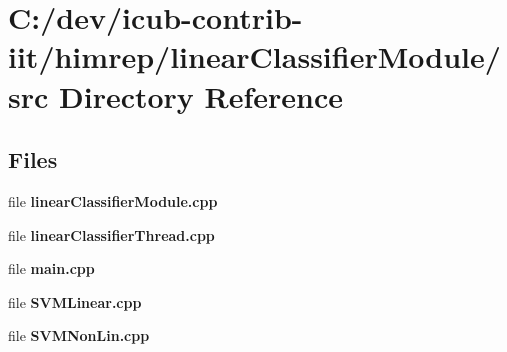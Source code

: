 \section{C\+:/dev/icub-\/contrib-\/iit/himrep/linear\+Classifier\+Module/src Directory Reference}
\label{dir_0d4ffddeea3200b1e76c3b34c505ad92}
\subsection*{Files}
\begin{DoxyCompactItemize}
\item 
file {\bfseries linear\+Classifier\+Module.\+cpp}
\item 
file {\bfseries linear\+Classifier\+Thread.\+cpp}
\item 
file {\bfseries main.\+cpp}
\item 
file {\bfseries S\+V\+M\+Linear.\+cpp}
\item 
file {\bfseries S\+V\+M\+Non\+Lin.\+cpp}
\end{DoxyCompactItemize}
